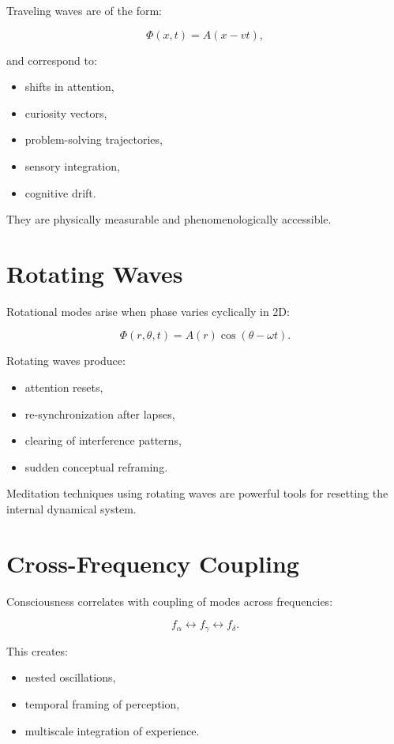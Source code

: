 \documentclass[12pt]{article}
\begin{document}
Traveling waves are of the form:

\[
\Phi(x,t) = A(x - vt),
\]

and correspond to:

\begin{itemize}
    \item shifts in attention,
    \item curiosity vectors,
    \item problem-solving trajectories,
    \item sensory integration,
    \item cognitive drift.
\end{itemize}

They are physically measurable and phenomenologically accessible.

\section{Rotating Waves}

Rotational modes arise when phase varies cyclically in 2D:

\[
\Phi(r,\theta,t) = A(r)\cos(\theta - \omega t).
\]

Rotating waves produce:

\begin{itemize}
    \item attention resets,
    \item re-synchronization after lapses,
    \item clearing of interference patterns,
    \item sudden conceptual reframing.
\end{itemize}

Meditation techniques using rotating waves are powerful tools for resetting the
internal dynamical system.

\section{Cross-Frequency Coupling}

Consciousness correlates with coupling of modes across frequencies:

\[
f_{\alpha} \leftrightarrow f_{\gamma} \leftrightarrow f_{\delta}.
\]

This creates:

\begin{itemize}
    \item nested oscillations,
    \item temporal framing of perception,
    \item multiscale integration of experience.
\end{itemize}
\end{document}
